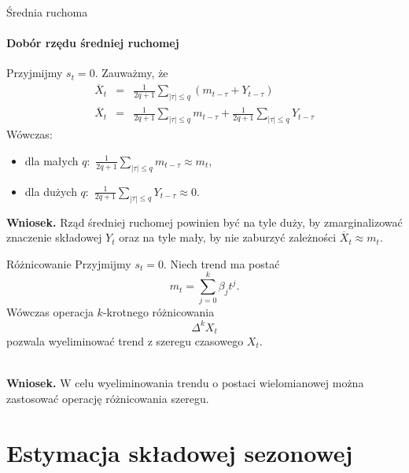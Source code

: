 \documentclass[a4paper, 11pt]{beamer}
\begin{document}
	\begin{frame}{Średnia ruchoma}
		\framesubtitle{Dobór rzędu średniej ruchomej}
		Przyjmijmy $s_t = 0.$ Zauważmy, że \begin{eqnarray*}
			\overline{X}_t & = &
				\frac{1}{2q + 1}
				\sum_{\left|\tau\right| \leq q} \left(m_{t-\tau} + Y_{t-\tau}\right)\\
			\overline{X}_t & = &
				\frac{1}{2q + 1} \sum_{\left|\tau\right| \leq q} m_{t-\tau} +
				\frac{1}{2q + 1} \sum_{\left|\tau\right| \leq q} Y_{t-\tau}
		\end{eqnarray*}
		Wówczas:
		\begin{itemize}
			\item dla małych $q:$
				$\frac{1}{2q + 1} \sum_{\left|\tau\right| \leq q} m_{t-\tau} 
				\approx m_t,$
			\item dla dużych $q:$
				$\frac{1}{2q + 1} \sum_{\left|\tau\right| \leq q} Y_{t-\tau} \approx 0.$
		\end{itemize}
		\begin{alert}{\textbf{Wniosek.}}
			Rząd średniej ruchomej powinien być na tyle duży, by zmarginalizować 
			znaczenie składowej $Y_t$ oraz na tyle mały, by nie zaburzyć zależności
			$\overline{X}_t \approx m_t.$
		\end{alert}
	\end{frame}
	
	\begin{frame}{Różnicowanie}
		Przyjmijmy $s_t = 0.$ Niech trend ma postać \[
			m_t = \sum_{j=0}^{k} \beta_j t^j.
		\]
		Wówczas operacja $k$-krotnego różnicowania \[
			\Delta^k X_t
		\] pozwala wyeliminować trend z szeregu czasowego $X_t.$
		\\~\\
		\begin{alert}{\textbf{Wniosek.}}
			W celu wyeliminowania trendu o postaci wielomianowej można zastosować
			operację różnicowania szeregu.
		\end{alert}
	\end{frame}

	\section{Estymacja składowej sezonowej}
	
\end{document}
